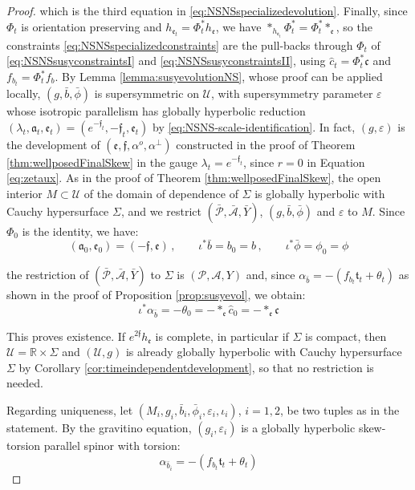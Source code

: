 \documentclass[10pt,reqno,a4paper]{amsart}
\theoremstyle{plain}
\theoremstyle{definition}
\theoremstyle{remark}
\theoremstyle{remark}
\newcommand{\frt}{\mathfrak{t}}
\def\cA{\mathcal{A}}
\def\cP{\mathcal{P}}
\def\frc{\mathfrak{c}}
\def\fra{\mathfrak{a}}
\def\cU{\mathcal{U}}
\def\fre{\mathfrak{e}}
\renewcommand{\(}{ (}
\renewcommand{\)}{ )}
\newcommand{\frf}{\mathfrak{f}}
\begin{document}
\begin{proof}
\noindent
which is the third equation in \eqref{eq:NSNSspecializedevolution}. Finally, since $\Phi_t$ is orientation preserving and $h_{\fre_t} = \Phi_t^{\ast}h_{\fre}$, we have $\ast_{h_{\fre_t}}\Phi_t^{\ast} = \Phi_t^{\ast}\ast_{\fre}$, so the constraints \eqref{eq:NSNSspecializedconstraints} are the pull-backs through $\Phi_t$ of \eqref{eq:NSNSsusyconstraintsI} and \eqref{eq:NSNSsusyconstraintsII}, using $\widehat{c}_t = \Phi_t^{\ast}\frc$ and $f_{b_t} = \Phi_t^{\ast}f_b$. By Lemma \ref{lemma:susyevolutionNS}, whose proof can be applied locally, $(g,\bar{b},\bar{\phi})$ is supersymmetric on $\cU$, with supersymmetry parameter $\varepsilon$ whose isotropic parallelism has globally hyperbolic reduction $(\lambda_t,\fra_t,\fre_t) = (e^{-\frf_t},-\frf_t,\fre_t)$ by \eqref{eq:NSNS-scale-identification}. In fact, $(g,\varepsilon)$ is the development of $(\fre,\frf,\alpha^o,\alpha^{\perp})$ constructed in the proof of Theorem \ref{thm:wellposedFinalSkew} in the gauge $\lambda_t = e^{-\frf_t}$, since $r = 0$ in Equation \eqref{eq:zetaux}. As in the proof of Theorem \ref{thm:wellposedFinalSkew}, the open interior $M\subset \cU$ of the domain of dependence of $\Sigma$ is globally hyperbolic with Cauchy hypersurface $\Sigma$, and we restrict $(\bar{\cP},\bar{\cA},\bar{Y})$, $(g,\bar{b},\bar{\phi})$ and $\varepsilon$ to $M$. Since $\Phi_0$ is the identity, we have:
\begin{equation*}
 (\fra_0,\fre_0) = (-\frf,\fre)\, , \qquad   \iota^{\ast}\bar{b} = b_0 = b\, , \qquad  \iota^{\ast}\bar{\phi} = \phi_0 = \phi
\end{equation*}

\noindent
the restriction of $(\bar{\cP},\bar{\cA},\bar{Y})$ to $\Sigma$ is $(\cP,\cA,Y)$ and, since $\alpha_{\bar{b}} = -(f_{b_t}\frt_t + \theta_t)$ as shown in the proof of Proposition \ref{prop:susyevol}, we obtain:
\begin{equation*}
\iota^{\ast}\alpha_{\bar{b}} = -\theta_0 = -\ast_{\fre}\widehat{c}_0 = -\ast_{\fre}\frc    
\end{equation*}

\noindent
This proves existence. If $e^{2\frf}h_{\fre}$ is complete, in particular if $\Sigma$ is compact, then $\cU = \mathbb{R}\times\Sigma$ and $(\cU,g)$ is already globally hyperbolic with Cauchy hypersurface $\Sigma$ by Corollary \ref{cor:timeindependentdevelopment}, so that no restriction is needed. 

\noindent
Regarding uniqueness, let $(M_i,g_i,\bar{b}_i,\bar{\phi}_i,\varepsilon_i,\iota_i)$, $i = 1,2$, be two tuples as in the statement. By the gravitino equation, $(g_i,\varepsilon_i)$ is a globally hyperbolic skew-torsion parallel spinor with torsion:
\begin{equation*}
\alpha_{\bar{b}_i} = -(f_{b_t}\frt_t + \theta_t)    
\end{equation*}


\end{proof}
\end{document}
